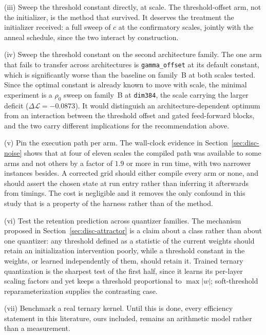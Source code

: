 \documentclass[final,5p,times,twocolumn]{elsarticle}
\theoremstyle{remark}
\newcommand{\rhoz}{\rho_{0}}
\newcommand{\dL}{\Delta\mathcal{L}}
\begin{document}
(iii) Sweep the threshold constant directly, at scale. The
threshold-offset arm, not the initializer, is the method that survived. It
deserves the treatment the initializer received: a full sweep of $c$ at the
confirmatory scales, jointly with the anneal schedule, since the two interact
by construction.

(iv) Sweep the threshold constant on the second architecture
family. The one arm that fails to transfer across architectures is
\texttt{gamma\_offset} at its default constant, which is significantly worse
than the baseline on family~B at both scales tested. Since the optimal
constant is already known to move with scale, the minimal experiment is a
$\rhoz$ sweep on family~B at \texttt{dim384}, the scale carrying the larger
deficit ($\dL = -0.0873$). It would distinguish an
architecture-dependent optimum from an interaction between the threshold
offset and gated feed-forward blocks, and the two carry different implications
for the recommendation above.

(v) Pin the execution path per arm. The wall-clock evidence in
Section~\ref{sec:disc-noise} shows that at four of eleven scales the compiled
path was available to some arms and not others by a factor of $1.9$ or more in
run time, with two narrower instances besides. A corrected grid should
either compile every arm or none, and should assert the chosen state at run
entry rather than inferring it afterwards from timings. The cost is
negligible and it removes the only confound in this study that is a property of
the harness rather than of the method.

(vi) Test the retention prediction across quantizer families. The
mechanism proposed in Section~\ref{sec:disc-attractor} is a claim about a
class rather than about one quantizer: any threshold defined as a statistic of
the current weights should retain an initialization intervention poorly, while
a threshold constant in the weights, or learned independently of them, should
retain it. Trained ternary quantization \cite{zhu2017a} is the sharpest test
of the first half, since it learns its per-layer scaling factors and yet keeps
a threshold proportional to $\max|w|$; soft-threshold
reparameterization \cite{kusupati2020} supplies the contrasting case.

(vii) Benchmark a real ternary kernel. Until this is done, every
efficiency statement in this literature, ours included, remains an arithmetic
model rather than a measurement.

\end{document}
